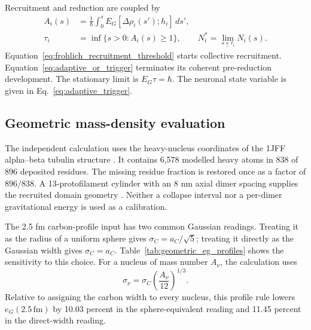 Recruitment and reduction are coupled by
\begin{equation}
\begin{aligned}
  A_i(s)&=\frac{1}{\hbar}\int_0^s
  E_G[\Delta\rho_i(s');h_i]\,ds',\\
  \tau_i&=\inf\{s>0:A_i(s)\geq1\},
  \qquad
  N_i^*=\lim_{s\uparrow\tau_i}N_i(s).
\end{aligned}
  \label{eq:adaptive_or_trigger}
\end{equation}
\noindent Equation~\eqref{eq:frohlich_recruitment_threshold} starts collective
recruitment. Equation~\eqref{eq:adaptive_or_trigger} terminates its coherent
pre-reduction development. The stationary limit is $E_G\tau=\hbar$. The neuronal
state variable is given in Eq.~\eqref{eq:adaptive_trigger}.

\subsection{Geometric mass-density evaluation}

The independent calculation uses the heavy-nucleus coordinates of the 1JFF
alpha--beta tubulin structure \citep{lowe2001}. It contains 6,578 modelled heavy
atoms in 838 of 896 deposited residues. The missing residue fraction is restored
once as a factor of $896/838$. A 13-protofilament cylinder with an 8 nm axial dimer
spacing supplies the recruited domain geometry \citep{fourniol2010}. Neither a
collapse interval nor a per-dimer gravitational energy is used as a calibration.

The 2.5 fm carbon-profile input has two common Gaussian readings. Treating it as
the radius of a uniform sphere gives $\sigma_C=a_C/\sqrt{5}$; treating it directly
as the Gaussian width gives $\sigma_C=a_C$. Table~\ref{tab:geometric_eg_profiles}
shows the sensitivity to this choice. For a nucleus of mass number $A_\nu$, the
calculation uses
\begin{equation}
  \sigma_\nu=\sigma_C\left(\frac{A_\nu}{12}\right)^{1/3}.
  \label{eq:nuclear_profile_scaling}
\end{equation}
Relative to assigning the carbon width to every nucleus, this profile rule lowers
$e_G(2.5\,\mathrm{fm})$ by 10.03 percent in the sphere-equivalent reading and
11.45 percent in the direct-width reading.

